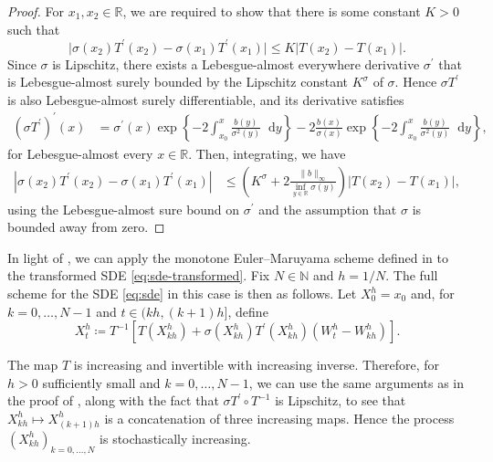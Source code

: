\documentclass[oneside]{amsart}
\theoremstyle{definition}
\newcommand{\N}{\mathbb N}
\newcommand{\R}{\mathbb R}
\newcommand{\D}{\mathop{}\!\mathrm{d}}
\def\R{{\mathbb R}}
\numberwithin{equation}{section}
\begin{document}
\begin{proof}
	For $x_1, x_2 \in \R$, we are required to show that there is some constant $K > 0$ such that
	\begin{equation}
		\lvert \sigma(x_2) T^\prime(x_2) - \sigma(x_1) T^\prime(x_1) \rvert \leq K \lvert T(x_2) - T(x_1)\rvert.
	\end{equation}
	Since $\sigma$ is Lipschitz, there exists a Lebesgue-almost everywhere derivative $\sigma^\prime$ that is Lebesgue-almost surely bounded by the Lipschitz constant $K^\sigma$ of $\sigma$. Hence $\sigma T^\prime$ is also Lebesgue-almost surely differentiable, and its derivative satisfies
	\begin{equation}
		\begin{split}
			(\sigma T^\prime)^\prime(x)
			& = \sigma^\prime(x) \exp\!\left\{ - 2 \int_{x_0}^x \frac{b(y)}{\sigma^2(y)} \D y \right\} - 2 \frac{b(x)}{\sigma(x)}\exp\!\left\{- 2 \int_{x_0}^x \frac{b(y)}{\sigma^2(y)} \D y\right\},
		\end{split}
	\end{equation}
	for Lebesgue-almost every $x \in \R$. Then, integrating, we have
	\begin{equation}
		\begin{split}
			\!\left\lvert \sigma(x_2)T^\prime(x_2) - \sigma(x_1)T^\prime(x_1)\right \rvert
			& \leq \!\left(K^\sigma + 2 \frac{\lVert b\rVert_\infty}{\inf_{y \in \R}\sigma(y)}\right)\lvert T(x_2) - T(x_1)\rvert, 
		\end{split}
	\end{equation}
	using the Lebesgue-almost sure bound on $\sigma^\prime$ and the assumption that $\sigma$ is bounded away from zero.
\end{proof}

In light of , we can apply the monotone Euler--Maruyama scheme defined in  to the transformed SDE \eqref{eq:sde-transformed}. Fix $N \in \N$ and $h = 1/N$. The full scheme for the SDE \eqref{eq:sde} in this case is then as follows. Let $X^h_0 = x_0$ and, for $k = 0, \dotsc, N - 1$ and $t \in (kh, (k+1)h]$, define
\begin{equation}\label{eq:transformed-em}
	X^h_t\coloneqq  T^{-1}\!\left[T(X^h_{kh}) + \sigma(X^h_{kh})T^{\prime}(X^h_{kh})(W^h_t - W^h_{kh})\right].
\end{equation}

The map $T$ is increasing and invertible with increasing inverse. Therefore, for $h > 0$ sufficiently small and $k = 0, \dotsc, N - 1$, we can use the same arguments as in the proof of , along with the fact that $\sigma T^\prime \circ T^{-1}$ is Lipschitz, to see that $X^h_{kh} \mapsto X^h_{(k+1)h}$ is a concatenation of three increasing maps. Hence the process $(X^h_{kh})_{k = 0, \dotsc, N}$ is stochastically increasing.
\end{document}
